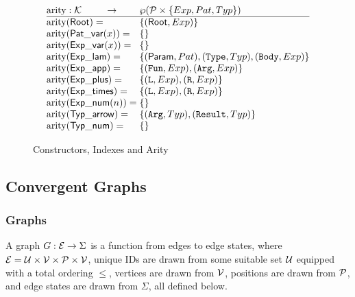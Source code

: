 

\begin{figure}
  \[
    \arraycolsep=0pt
    \begin{array}{ll}
      \arity : \K \hfil \rightarrow & \wp(\P \times \{Exp, Pat, Typ\}) \\
      \hline
      \arity(\Root)={} & \left\{ (\Root, Exp) \right\} \\
      \arity(\PatVar(x))={} & \left\{ \right\} \\
      \arity(\ExpVar(x))={} & \left\{ \right\} \\
      \arity(\ExpLam)={} & \left\{ (\LamParam, Pat), (\mathtt{Type}, Typ), (\mathtt{Body}, Exp) \right\} \\
      \arity(\ExpApp)={} & \left\{ (\mathtt{Fun}, Exp), (\mathtt{Arg}, Exp) \right\} \\
      \arity(\ExpPlus)={} & \left\{ (\mathtt{L}, Exp), (\mathtt{R}, Exp) \right\} \\
      \arity(\ExpTimes)={} & \left\{ (\mathtt{L}, Exp), (\mathtt{R}, Exp) \right\} \\
      \arity(\ExpNum(n))={} & \left\{ \right\} \\
      \arity(\TypArrow)={} & \left\{ (\mathtt{Arg}, Typ), (\mathtt{Result}, Typ) \right\} \\
      \arity(\TypNum)={} & \left\{ \right\} \\
    \end{array}
  \]
  \caption{Constructors, Indexes and Arity}
  \label{fig:Constructors, Indexes and Arity}
\end{figure}

\subsection{Convergent Graphs}%
\label{sub:Convergent Graphs}

\subsubsection{Graphs}%
\label{sub:Graphs}

A graph $G : \E \rightarrow \Sigma$ is a function from edges to edge states,
where $\E = \U \times \V \times \P \times \V$,
unique IDs are drawn from some suitable set $\U$ equipped with a total ordering $\leq$,
vertices are drawn from $\V$,
positions are drawn from $\P$,
and edge states are drawn from $\Sigma$, all defined below.

